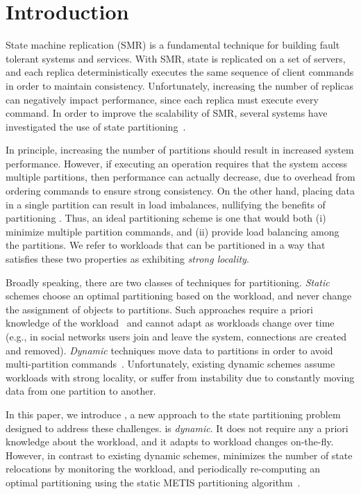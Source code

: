 \section{Introduction}

State machine replication (SMR) is a fundamental technique for
building fault tolerant systems and services. With SMR, state is
replicated on a set of servers, and each replica deterministically
executes the same sequence of client commands in order to maintain
consistency. Unfortunately, increasing the number of replicas can
negatively impact performance, since each replica must execute every
command.  In order to improve the scalability of SMR, several systems
have investigated the use of state partitioning~\cite{facebookTAO,
  sciascia2012sdur, Aguilera:2007}.

In principle, increasing the number of partitions should result in
increased system performance. However, if executing an operation
requires that the system access multiple partitions, then performance
can actually decrease, due to overhead from ordering commands to
ensure strong consistency. On the other hand, placing data in a single
partition can result in load imbalances, nullifying the benefits of
partitioning .  Thus, an ideal partitioning scheme is one that would
both (i) minimize multiple partition commands, and (ii) provide load
balancing among the partitions. We refer to workloads that can be
partitioned in a way that satisfies these two properties as exhibiting
\emph{strong locality}.

Broadly speaking, there are two classes of techniques for
partitioning. \emph{Static} schemes choose an optimal  partitioning
based on the workload, and never change the assignment of objects to
partitions. Such approaches require a priori knowledge of the
workload~\cite{curino2010sch} and cannot adapt as workloads change
over time (e.g., in social networks users join and leave the system,
connections are created and removed).  \emph{Dynamic} techniques move
data to partitions in order to avoid multi-partition
commands~\cite{long16}. Unfortunately, existing dynamic schemes assume
workloads with strong locality, or suffer from instability due to
constantly moving data from one partition to another.


In this paper, we introduce \dynastar, a new approach to the state
partitioning problem designed to address these challenges.  \dynastar
is \emph{dynamic}. It does not require any a priori knowledge about
the workload, and it adapts to workload changes on-the-fly. However,
in contrast to existing dynamic schemes, \dynastar minimizes the
number of state relocations by monitoring the workload, and
periodically re-computing an optimal partitioning using the static
METIS partitioning algorithm~\cite{Abou-Rjeili:2006}.



